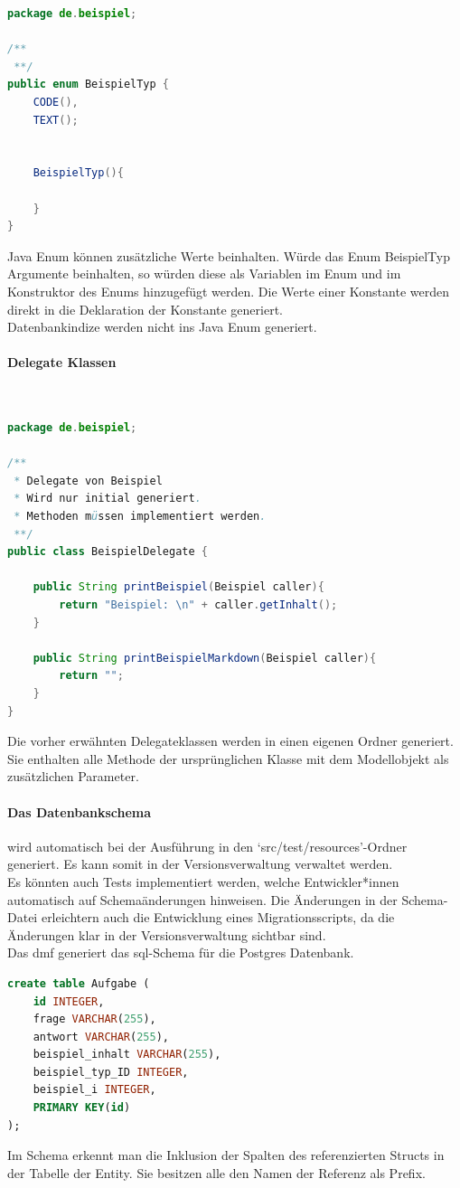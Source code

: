\documentclass[./einleitung.tex]{subfiles}
\begin{document}
    \begin{lstlisting}[language=Java, caption=BeispielTyp.java, label=lst:beispielTypJava]
package de.beispiel;

/**
 **/
public enum BeispielTyp {
    CODE(),
    TEXT();


    BeispielTyp(){

    }
}
    \end{lstlisting}
    Java Enum können zusätzliche Werte beinhalten.
    Würde das Enum BeispielTyp Argumente beinhalten, so würden diese als Variablen im Enum und im Konstruktor des Enums hinzugefügt werden.
    Die Werte einer Konstante werden direkt in die Deklaration der Konstante generiert.\\
    Datenbankindize werden nicht ins Java Enum generiert.
    
    \paragraph{Delegate Klassen}\mbox{}\\
    \begin{lstlisting}[language=Java, caption=BeispielDelegate.java, label=lst:beispielDelegateJava]
package de.beispiel;

/**
 * Delegate von Beispiel
 * Wird nur initial generiert.
 * Methoden müssen implementiert werden.
 **/
public class BeispielDelegate {

    public String printBeispiel(Beispiel caller){
        return "Beispiel: \n" + caller.getInhalt();
    }

    public String printBeispielMarkdown(Beispiel caller){
        return "";
    }
}
    \end{lstlisting}
    Die vorher erwähnten Delegateklassen werden in einen eigenen Ordner generiert.
    Sie enthalten alle Methode der ursprünglichen Klasse mit dem Modellobjekt als zusätzlichen Parameter.

    \paragraph{Das Datenbankschema} wird automatisch bei der Ausführung in den `src/test/resources'-Ordner generiert.
    Es kann somit in der Versionsverwaltung verwaltet werden.\\
    Es könnten auch Tests implementiert werden, welche Entwickler*innen automatisch auf Schemaänderungen hinweisen.
    Die Änderungen in der Schema-Datei erleichtern auch die Entwicklung eines Migrationsscripts, da die Änderungen klar in der Versionsverwaltung sichtbar sind.\\
    Das \acrshort{dmf} generiert das \acrshort{sql}-Schema für die Postgres Datenbank.
    \begin{lstlisting}[language=sql, caption=schema.sql, label=lst:schemaSQL]
create table Aufgabe (
    id INTEGER,
    frage VARCHAR(255),
    antwort VARCHAR(255),
    beispiel_inhalt VARCHAR(255),
    beispiel_typ_ID INTEGER,
    beispiel_i INTEGER,
    PRIMARY KEY(id)
);
    \end{lstlisting}
    Im Schema erkennt man die Inklusion der Spalten des referenzierten Structs in der Tabelle der Entity.
    Sie besitzen alle den Namen der Referenz als Prefix.
\end{document}
